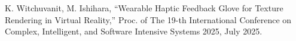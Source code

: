 \label{ap:research_list}



%

	\begin{enumerate}
		 K. Witchuvanit, M. Ishihara, ``Wearable Haptic Feedback Glove for Texture Rendering in Virtual Reality,'' Proc. of The 19-th International Conference on Complex, Intelligent, and Software Intensive Systems 2025, July 2025.
	\end{enumerate}
	
	
